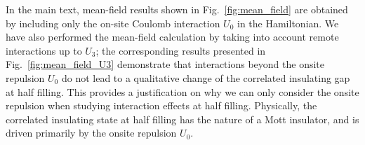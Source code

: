 \documentclass[aps,prx,floatfix,twocolumn]{revtex4-1}
\begin{document}
	In the main text,  mean-field results shown in Fig.~\ref{fig:mean_field} are obtained by including only the on-site Coulomb interaction $ U_0 $ in the Hamiltonian. We have also performed the mean-field calculation by taking into account remote interactions up to $U_3$; the corresponding results presented in Fig.~\ref{fig:mean_field_U3} demonstrate that interactions beyond the onsite repulsion $U_0$ do not lead to a qualitative change of the correlated insulating gap at half filling. This provides a justification on why we can only consider the onsite repulsion when studying interaction effects at half filling. Physically, the correlated insulating state at half filling has the nature of a Mott insulator, and is driven primarily by the onsite repulsion $U_0$. 

	
	
	
\end{document}
